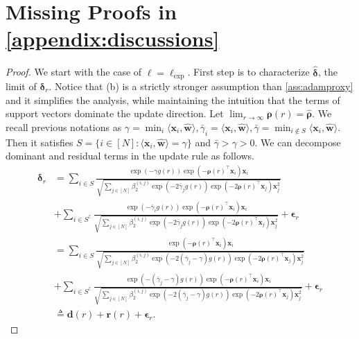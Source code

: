 \documentclass{article} %
\theoremstyle{plain}
\theoremstyle{definition}
\theoremstyle{remark}
\def\bdel{{\boldsymbol \delta}}
\begin{document}
\section[Missing Proofs in Appendix \ref{appendix:discussions}]{Missing Proofs in \cref{appendix:discussions}}
\DirectionNewproxy*
\begin{proof}
    We start with the case of $\ell = \ell_{\text{exp}}$. First step is to characterize $\hat{\bdel}$, the limit of $\bdel_r$. Notice that (b) is a strictly stronger assumption than \cref{ass:adamproxy} and it simplifies the analysis, while maintaining the intuition that the terms of support vectors dominate the update direction. Let $\lim_{r\rightarrow \infty} \boldsymbol{\rho}(r)=\hat{\boldsymbol{\rho}}$. We recall previous notations as $\gamma = \min_i \langle \mathbf{x}_i, \hat{\mathbf{w}} \rangle, \bar{\gamma}_i = \langle \mathbf{x}_i, \hat{\mathbf{w}} \rangle, \bar{\gamma} = \min_{i \notin S} \langle \mathbf{x}_i, \hat{\mathbf{w}} \rangle$. Then it satisfies $S = \{ i \in [N] : \langle \mathbf{x}_i, \hat{\mathbf{w}} \rangle = \gamma\}$ and $\bar{\gamma} > \gamma > 0$.
We can decompose dominant and residual terms in the update rule as follows.
    \begin{align*}
        \bdel_r &=\sum_{i \in S}\frac{\exp(-\gamma g(r))\exp(-\boldsymbol{\rho}(r)^\top \mathbf{x}_i) \mathbf{x}_i}{\sqrt{\sum_{j \in [N]}\beta_2^{(i, j)}\exp(-2\bar{\gamma}_j g(r))\exp(-2\boldsymbol{\rho}(r)^\top \mathbf{x}_j) \mathbf{x}_j^2}} \\ &+ 
        \sum_{i \in S^\complement}\frac{\exp(-\bar{\gamma}_i g(r))\exp(-\boldsymbol{\rho}(r)^\top \mathbf{x}_i) \mathbf{x}_i}{\sqrt{\sum_{j \in [N]}\beta_2^{(i, j)}\exp(-2\bar{\gamma}_j g(r))\exp(-2\boldsymbol{\rho}(r)^\top \mathbf{x}_j) \mathbf{x}_j^2}}+\boldsymbol{\epsilon}_r \\
        &=\sum_{i \in S}\frac{\exp(-\boldsymbol{\rho}(r)^\top \mathbf{x}_i) \mathbf{x}_i}{\sqrt{\sum_{j \in [N]}\beta_2^{(i, j)}\exp(-2(\bar{\gamma}_j-\gamma)g(r))\exp(-2\boldsymbol{\rho}(r)^\top \mathbf{x}_j) \mathbf{x}_j^2}} \\ &+ 
        \sum_{i \in S^\complement}\frac{\exp(-(\bar{\gamma}_j-\gamma)g(r))\exp(-\boldsymbol{\rho}(r)^\top \mathbf{x}_i) \mathbf{x}_i}{\sqrt{\sum_{j \in [N]}\beta_2^{(i, j)}\exp(-2(\bar{\gamma}_j-\gamma)g(r))\exp(-2\boldsymbol{\rho}(r)^\top \mathbf{x}_j) \mathbf{x}_j^2}}+\boldsymbol{\epsilon}_r \\
        &\triangleq \mathbf{d}(r) + \mathbf{r}(r)+\boldsymbol{\epsilon}_r.
    \end{align*}


\end{proof}
\end{document}
